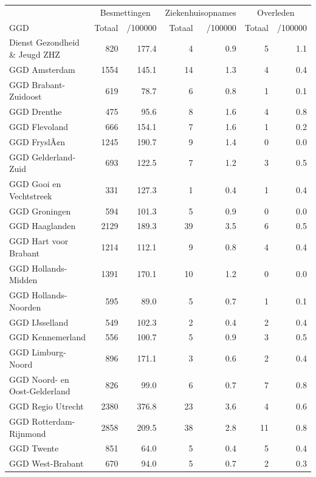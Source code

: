 \documentclass[
  english,
  man,floatsintext]{apa6}
\begin{document}
\begin{table}
\centering\begingroup\fontsize{10}{12}\selectfont

\begin{threeparttable}
\begin{tabular}{lrrrrrr}
\toprule
\multicolumn{1}{c}{ } & \multicolumn{2}{c}{Besmettingen} & \multicolumn{2}{c}{Ziekenhuisopnames} & \multicolumn{2}{c}{Overleden} \\
\cmidrule(l{3pt}r{3pt}){2-3} \cmidrule(l{3pt}r{3pt}){4-5} \cmidrule(l{3pt}r{3pt}){6-7}
GGD & Totaal & /100000 & Totaal & /100000 & Totaal & /100000\\
\midrule
Dienst Gezondheid \& Jeugd ZHZ & 820 & 177.4 & 4 & 0.9 & 5 & 1.1\\
GGD Amsterdam & 1554 & 145.1 & 14 & 1.3 & 4 & 0.4\\
GGD Brabant-Zuidoost & 619 & 78.7 & 6 & 0.8 & 1 & 0.1\\
GGD Drenthe & 475 & 95.6 & 8 & 1.6 & 4 & 0.8\\
GGD Flevoland & 666 & 154.1 & 7 & 1.6 & 1 & 0.2\\
GGD FryslÃ¢n & 1245 & 190.7 & 9 & 1.4 & 0 & 0.0\\
GGD Gelderland-Zuid & 693 & 122.5 & 7 & 1.2 & 3 & 0.5\\
GGD Gooi en Vechtstreek & 331 & 127.3 & 1 & 0.4 & 1 & 0.4\\
GGD Groningen & 594 & 101.3 & 5 & 0.9 & 0 & 0.0\\
GGD Haaglanden & 2129 & 189.3 & 39 & 3.5 & 6 & 0.5\\
GGD Hart voor Brabant & 1214 & 112.1 & 9 & 0.8 & 4 & 0.4\\
GGD Hollands-Midden & 1391 & 170.1 & 10 & 1.2 & 0 & 0.0\\
GGD Hollands-Noorden & 595 & 89.0 & 5 & 0.7 & 1 & 0.1\\
GGD IJsselland & 549 & 102.3 & 2 & 0.4 & 2 & 0.4\\
GGD Kennemerland & 556 & 100.7 & 5 & 0.9 & 3 & 0.5\\
GGD Limburg-Noord & 896 & 171.1 & 3 & 0.6 & 2 & 0.4\\
GGD Noord- en Oost-Gelderland & 826 & 99.0 & 6 & 0.7 & 7 & 0.8\\
GGD Regio Utrecht & 2380 & 376.8 & 23 & 3.6 & 4 & 0.6\\
GGD Rotterdam-Rijnmond & 2858 & 209.5 & 38 & 2.8 & 11 & 0.8\\
GGD Twente & 851 & 64.0 & 5 & 0.4 & 5 & 0.4\\
GGD West-Brabant & 670 & 94.0 & 5 & 0.7 & 2 & 0.3\\

\end{tabular}
\end{threeparttable}
\end{table}
\end{document}
